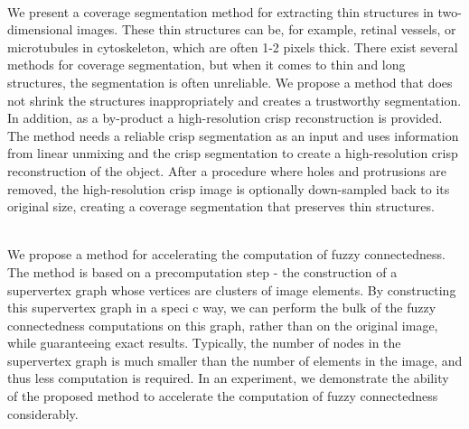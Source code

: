 {{{\begin{enumerate}
\\ \aabstract
We present a coverage segmentation method for extracting thin structures in two-dimensional images. These thin structures can be, for example, retinal vessels, or microtubules in cytoskeleton, which are often 1-2 pixels thick. There exist several methods for coverage segmentation, but when it comes to thin and long structures, the segmentation is often unreliable. We propose a method that does not shrink the structures inappropriately and creates a trustworthy segmentation. In addition, as a by-product a high-resolution crisp reconstruction is provided. The method needs a reliable crisp segmentation as an input and uses information from linear unmixing and the crisp segmentation to create a high-resolution crisp reconstruction of the object. After a procedure where holes and protrusions are removed, the high-resolution crisp image is optionally down-sampled back to its original size, creating a coverage segmentation that preserves thin structures.


\\ \aabstract
We propose a method for accelerating the computation of fuzzy connectedness. The method is based on a precomputation step - the construction of a supervertex graph whose vertices are clusters of image elements. By constructing this supervertex graph in a speci c way, we can perform the bulk of the fuzzy connectedness computations on this graph, rather than on the original image, while guaranteeing exact results. Typically, the number of nodes in the supervertex graph is much smaller than the number of elements in the image, and thus less computation is required. In an experiment, we demonstrate the ability of the proposed method to accelerate the computation of fuzzy connectedness considerably.
 

\end{enumerate}}}}
